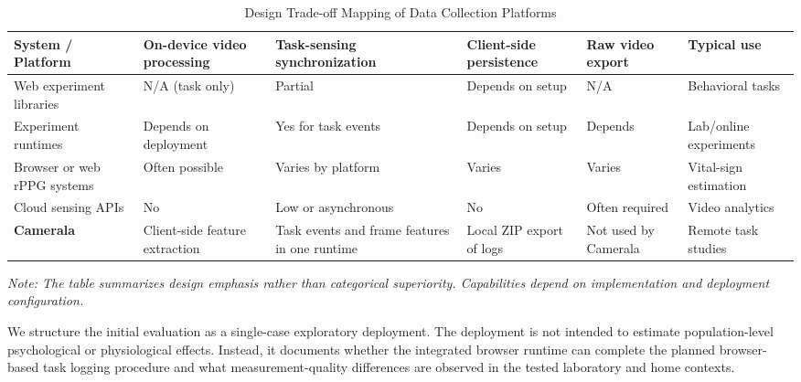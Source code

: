 \documentclass[dvipdfmx]{ehis}
\begin{document}
\begin{table}[t]
    \begin{center}
    \caption{Design Trade-off Mapping of Data Collection Platforms}
\label{tab:related_work}
\scriptsize
\setlength{\tabcolsep}{2pt}
\begin{tabular}{p{}p{}p{}p{}p{}p{}}
\toprule
\textbf{System / Platform} & \textbf{On-device video processing} & \textbf{Task-sensing synchronization} & \textbf{Client-side persistence} & \textbf{Raw video export} & \textbf{Typical use} \\
\midrule
Web experiment libraries & N/A (task only) & Partial & Depends on setup & N/A & Behavioral tasks \\
Experiment runtimes & Depends on deployment & Yes for task events & Depends on setup & Depends & Lab/online experiments \\
Browser or web rPPG systems & Often possible & Varies by platform & Varies & Varies & Vital-sign estimation \\
Cloud sensing APIs & No & Low or asynchronous & No & Often required & Video analytics \\
\textbf{Camerala} & Client-side feature extraction & Task events and frame features in one runtime & Local ZIP export of logs & Not used by Camerala & Remote task studies \\
\bottomrule
\end{tabular}
\vspace{1mm}

\scriptsize{\textit{Note: The table summarizes design emphasis rather than categorical superiority. Capabilities depend on implementation and deployment configuration.}}
\end{center}
\end{table}

We structure the initial evaluation as a single-case exploratory deployment.
The deployment is not intended to estimate population-level psychological or physiological effects.
Instead, it documents whether the integrated browser runtime can complete the planned browser-based task logging procedure and what measurement-quality differences are observed in the tested laboratory and home contexts.

\end{document}

